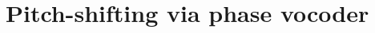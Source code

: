 \documentclass[class=article,crop=false]{standalone}
\begin{document}
\section{Pitch-shifting via phase vocoder}
\end{document}
